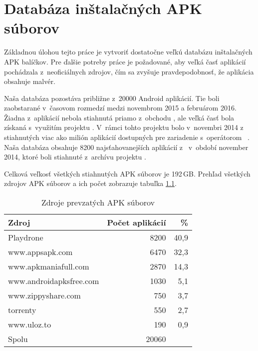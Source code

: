 \chapter{Databáza inštalačných APK súborov}
Základnou úlohou tejto práce je vytvoriť dostatočne veľkú databázu inštalačných APK balíčkov. Pre ďalšie potreby práce je požadované, aby veľká časť aplikácií pochádzala z~neoficiálnych zdrojov, čím sa zvyšuje pravdepodobnosť, že aplikácia obsahuje malvér.

Naša databáza pozostáva približne z~20000 Android aplikácií. Tie boli zaobstarané v~časovom rozmedzí medzi novembrom 2015 a februárom 2016. Žiadna z~aplikácií nebola stiahnutá priamo z~obchodu , ale veľká časť bola získaná s~využitím projektu . V~rámci tohto projektu bolo v~novembri 2014 z~ stiahnutých viac ako milión aplikácií dostupných pre zariadenie  s~operátorom ~\cite{Viennot2014}. Naša databáza obsahuje 8200 najsťahovanejších aplikácií z~ v~období november 2014, ktoré boli stiahnuté z~archívu projektu .

Celková veľkosť všetkých stiahnutých APK súborov je 192\,GB. Prehľad všetkých zdrojov APK súborov a ich počet zobrazuje tabuľka \ref{tab:stahovanie}. 

\begin{table}[htb]
\centering
  \begin{tabular}{|l r r|}
    \hline
    \textbf{Zdroj} & \textbf{Počet aplikácií} & \textbf{\%} \\\hline\hline
    Playdrone & 8200 & 40,9\\
    www.appsapk.com & 6470 & 32,3\\
    www.apkmaniafull.com & 2870 & 14,3\\
    www.androidapksfree.com & 1030 & 5,1\\
    www.zippyshare.com & 750 & 3,7\\
    torrenty & 550 & 2,7\\
    www.uloz.to & 190 & 0,9\\
    \midrule\hline
    Spolu & 20060 & \\
    \hline
  \end{tabular}
  \caption{Zdroje prevzatých APK súborov}
  \label{tab:stahovanie}
\end{table}


